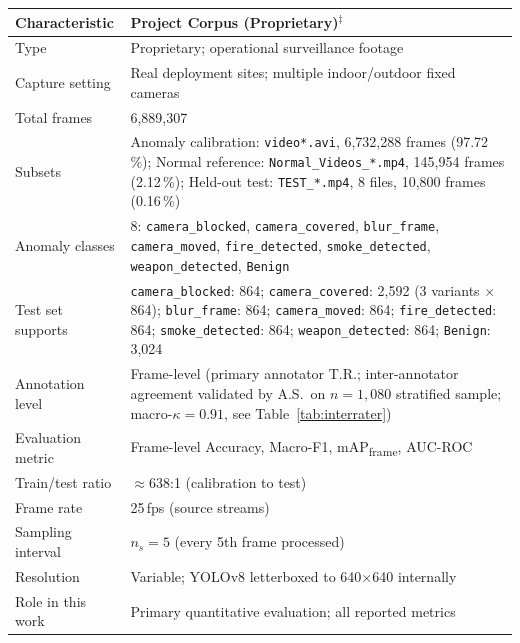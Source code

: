 \documentclass[sensors,article,submit,pdftex,moreauthors]{Definitions/mdpi}
\begin{document}
\begin{table}[H]
\vspace{6pt}
 
\begin{tabular}{p{2.6cm} p{11.0cm}}
\toprule
\textbf{Characteristic} & \textbf{Project Corpus (Proprietary)}$^\ddagger$ \\
\midrule
Type              & Proprietary; operational surveillance footage \\
Capture setting   & Real deployment sites; multiple indoor/outdoor fixed cameras \\
Total frames      & 6{,}889{,}307 \\
Subsets           & Anomaly calibration: \texttt{video*.avi}, 6{,}732{,}288 frames (97.72\,\%);
                    Normal reference: \texttt{Normal\_Videos\_*.mp4}, 145{,}954 frames (2.12\,\%);
                    Held-out test: \texttt{TEST\_*.mp4}, 8 files, 10{,}800 frames (0.16\,\%) \\
Anomaly classes   & 8: \texttt{camera\_blocked}, \texttt{camera\_covered}, \texttt{blur\_frame},
                    \texttt{camera\_moved}, \texttt{fire\_detected}, \texttt{smoke\_detected},
                    \texttt{weapon\_detected}, \texttt{Benign} \\
Test set supports & \texttt{camera\_blocked}: 864; \texttt{camera\_covered}: 2{,}592
                    (3 variants $\times$ 864); \texttt{blur\_frame}: 864;
                    \texttt{camera\_moved}: 864; \texttt{fire\_detected}: 864;
                    \texttt{smoke\_detected}: 864; \texttt{weapon\_detected}: 864;
                    \texttt{Benign}: 3{,}024 \\
Annotation level  & Frame-level (primary annotator T.R.; inter-annotator agreement validated by A.S.\ on $n{=}1{,}080$ stratified sample; macro-$\kappa = 0.91$, see Table~\ref{tab:interrater}) \\
Evaluation metric & Frame-level Accuracy, Macro-F1, mAP\textsubscript{frame}, AUC-ROC \\
Train/test ratio  & $\approx$638:1 (calibration to test) \\
Frame rate        & 25\,fps (source streams) \\
Sampling interval & $n_s = 5$ (every 5th frame processed) \\
Resolution        & Variable; YOLOv8 letterboxed to 640$\times$640 internally \\
Role in this work & Primary quantitative evaluation; all reported metrics \\
\bottomrule
\end{tabular}
\end{table}
 
\end{document}
